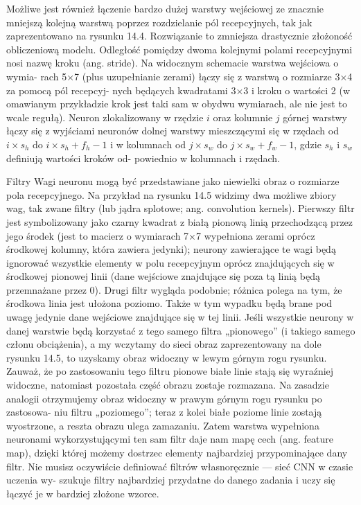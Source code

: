 \documentclass[12pt]{mwbk}
\theoremstyle{plain}
\theoremstyle{definition}
\theoremstyle{remark}
\begin{document}
Możliwe jest również łączenie bardzo dużej warstwy wejściowej ze znacznie mniejszą kolejną warstwą
poprzez rozdzielanie pól recepcyjnych, tak jak zaprezentowano na rysunku 14.4. Rozwiązanie to
zmniejsza drastycznie złożoność obliczeniową modelu. Odległość pomiędzy dwoma kolejnymi polami
recepcyjnymi nosi nazwę kroku (ang. stride). Na widocznym schemacie warstwa wejściowa o wymia-
rach 5×7 (plus uzupełnianie zerami) łączy się z warstwą o rozmiarze 3×4 za pomocą pól recepcyj-
nych będących kwadratami 3×3 i kroku o wartości 2 (w omawianym przykładzie krok jest taki sam
w obydwu wymiarach, ale nie jest to wcale regułą). Neuron zlokalizowany w rzędzie $i$ oraz kolumnie $j$
górnej warstwy łączy się z wyjściami neuronów dolnej warstwy mieszczącymi się w rzędach od
$i\times s_h$ do $i\times s_h +f_h -1$ i w kolumnach od $j\times s_w$ do $j \times s_w +f_w -1$, gdzie $s_h$ i $s_w$ definiują wartości kroków od-
powiednio w kolumnach i rzędach.

Filtry
Wagi neuronu mogą być przedstawiane jako niewielki obraz o rozmiarze pola recepcyjnego. Na
przykład na rysunku 14.5 widzimy dwa możliwe zbiory wag, tak zwane filtry (lub jądra splotowe;
ang. convolution kernels). Pierwszy filtr jest symbolizowany jako czarny kwadrat z białą pionową
linią przechodzącą przez jego środek (jest to macierz o wymiarach 7×7 wypełniona zerami oprócz
środkowej kolumny, która zawiera jedynki); neurony zawierające te wagi będą ignorować wszystkie
elementy w polu recepcyjnym oprócz znajdujących się w środkowej pionowej linii (dane wejściowe
znajdujące się poza tą linią będą przemnażane przez 0). Drugi filtr wygląda podobnie; różnica
polega na tym, że środkowa linia jest ułożona poziomo. Także w tym wypadku będą brane pod uwagę
jedynie dane wejściowe znajdujące się w tej linii.
Jeśli wszystkie neurony w danej warstwie będą korzystać z tego samego filtra „pionowego” (i takiego
samego członu obciążenia), a my wczytamy do sieci obraz zaprezentowany na dole rysunku 14.5,
to uzyskamy obraz widoczny w lewym górnym rogu rysunku. Zauważ, że po zastosowaniu tego filtru
pionowe białe linie stają się wyraźniej widoczne, natomiast pozostała część obrazu zostaje rozmazana.
Na zasadzie analogii otrzymujemy obraz widoczny w prawym górnym rogu rysunku po zastosowa-
niu filtru „poziomego”; teraz z kolei białe poziome linie zostają wyostrzone, a reszta obrazu ulega
zamazaniu. Zatem warstwa wypełniona neuronami wykorzystującymi ten sam filtr daje nam mapę
cech (ang. feature map), dzięki której możemy dostrzec elementy najbardziej przypominające dany
filtr. Nie musisz oczywiście definiować filtrów własnoręcznie — sieć CNN w czasie uczenia wy-
szukuje filtry najbardziej przydatne do danego zadania i uczy się łączyć je w bardziej złożone
wzorce.
\end{document}
